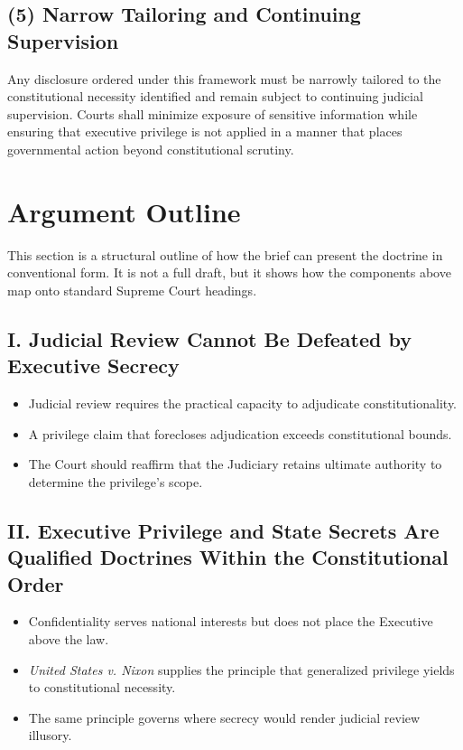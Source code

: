 \documentclass[12pt]{article}
\begin{document}
\subsection*{(5) Narrow Tailoring and Continuing Supervision}
Any disclosure ordered under this framework must be narrowly tailored to the constitutional necessity identified and remain subject to continuing judicial supervision.
Courts shall minimize exposure of sensitive information while ensuring that executive privilege is not applied in a manner that places governmental action beyond constitutional scrutiny.

\section*{Argument Outline}
This section is a structural outline of how the brief can present the doctrine in conventional form.
It is not a full draft, but it shows how the components above map onto standard Supreme Court headings.

\subsection*{I. Judicial Review Cannot Be Defeated by Executive Secrecy}
\begin{itemize}[leftmargin=*, itemsep=0.3em]
  \item Judicial review requires the practical capacity to adjudicate constitutionality.
  \item A privilege claim that forecloses adjudication exceeds constitutional bounds.
  \item The Court should reaffirm that the Judiciary retains ultimate authority to determine the privilege's scope.
\end{itemize}

\subsection*{II. Executive Privilege and State Secrets Are Qualified Doctrines Within the Constitutional Order}
\begin{itemize}[leftmargin=*, itemsep=0.3em]
  \item Confidentiality serves national interests but does not place the Executive above the law.
  \item \emph{United States v. Nixon} supplies the principle that generalized privilege yields to constitutional necessity.
  \item The same principle governs where secrecy would render judicial review illusory.
\end{itemize}
\end{document}
